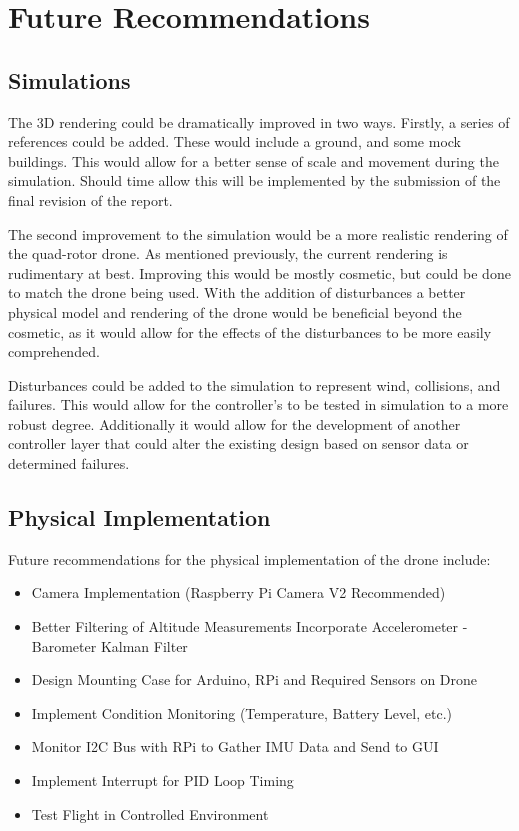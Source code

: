 \section{Future Recommendations}

\subsection{Simulations}
\label{recs:3d}
The 3D rendering could be dramatically improved in two ways.  Firstly, a series of references could be added.  These would include a ground, and some mock buildings.  This would allow for a better sense of scale and movement during the simulation.  Should time allow this will be implemented by the submission of the final revision of the report.

The second improvement to the simulation would be a more realistic rendering of the quad-rotor drone.  As mentioned previously, the current rendering is rudimentary at best.  Improving this would be mostly cosmetic, but could be done to match the drone being used.  With the addition of disturbances a better physical model and rendering of the drone would be beneficial beyond the cosmetic, as it would allow for the effects of the disturbances to be more easily comprehended.

Disturbances could be added to the simulation to represent wind, collisions, and failures.  This would allow for the controller's to be tested in simulation to a more robust degree.  Additionally it would allow for the development of another controller layer that could alter the existing design based on sensor data or determined failures.


\subsection{Physical Implementation}

Future recommendations for the physical implementation of the drone include:

\begin{itemize}
\item Camera Implementation (Raspberry Pi Camera V2 Recommended)
\item Better Filtering of Altitude Measurements Incorporate Accelerometer - Barometer Kalman Filter
\item Design Mounting Case for Arduino, RPi and Required Sensors on Drone
\item Implement Condition Monitoring (Temperature, Battery Level, etc.)
\item Monitor I2C Bus with RPi to Gather IMU Data and Send to GUI
\item Implement Interrupt for PID Loop Timing
\item Test Flight in Controlled Environment
\end{itemize}

